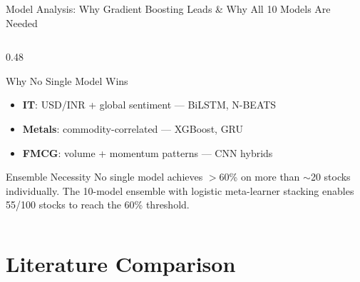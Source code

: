 \documentclass[aspectratio=43,11pt]{beamer}
\begin{document}
\begin{frame}[shrink=12]{Model Analysis: Why Gradient Boosting Leads \& Why All 10 Models Are Needed}
\begin{columns}[T]
\begin{column}{0.48\textwidth}
\begin{exampleblock}{Why No Single Model Wins}
\begin{itemize}
                    \item \textbf{IT}: USD/INR + global sentiment --- BiLSTM, N-BEATS
                    \item \textbf{Metals}: commodity-correlated --- XGBoost, GRU
                    \item \textbf{FMCG}: volume + momentum patterns --- CNN hybrids
                \end{itemize}
            \end{exampleblock}
            \begin{alertblock}{Ensemble Necessity}
                \footnotesize No single model achieves $>$60\% on more than $\sim$20 stocks individually. The 10-model ensemble with logistic meta-learner stacking enables 55/100 stocks to reach the 60\% threshold.
            \end{alertblock}
        \end{column}
    \end{columns}
\end{frame}

\section{Literature Comparison}
\end{document}
